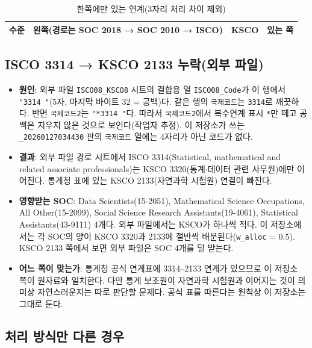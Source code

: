 \documentclass[11pt]{article}
\begin{document}
\begin{longtable}{L{1.8cm}L{5.8cm}L{4.8cm}L{3.0cm}}
\caption{한쪽에만 있는 연계(3자리 처리 차이 제외)}\label{tab:diff}\\
\toprule
수준 & 왼쪽(경로는 SOC 2018 → SOC 2010 → ISCO) & KSCO & 있는 쪽 \\
\midrule

\bottomrule
\end{longtable}

\subsection{ISCO 3314 → KSCO 2133 누락(외부 파일)}

\begin{itemize}[leftmargin=*]
  \item \textbf{원인}: 외부 파일 \texttt{ISCO08\_KSCO8} 시트의 결합용 열 \texttt{ISCO08\_Code}가 이 행에서 \texttt{"3314 "}(5자, 마지막 바이트 32 = 공백)다. 같은 행의 \texttt{국제코드}는 \texttt{3314}로 깨끗하다. 반면 \texttt{국제코드2}는 \texttt{"*3314 "}다. 따라서 \texttt{국제코드2}에서 복수연계 표시 \texttt{*}만 떼고 공백은 지우지 않은 것으로 보인다(작업자 추정). 이 저장소가 쓰는 \texttt{\_20260127034430} 판의 \texttt{국제코드} 열에는 4자리가 아닌 코드가 없다.
  \item \textbf{결과}: 외부 파일 경로 시트에서 ISCO 3314(Statistical, mathematical and related associate professionals)는 KSCO 3320(통계$\cdot$데이터 관련 사무원)에만 이어진다. 통계청 표에 있는 KSCO 2133(자연과학 시험원) 연결이 빠진다.
  \item \textbf{영향받는 SOC}: Data Scientists(15-2051), Mathematical Science Occupations, All Other(15-2099), Social Science Research Assistants(19-4061), Statistical Assistants(43-9111) 4개다. 외부 파일에서는 KSCO가 하나씩 적다. 이 저장소에서는 각 SOC의 양이 KSCO 3320과 2133에 절반씩 배분된다(\texttt{w\_alloc} = 0.5). KSCO 2133 쪽에서 보면 외부 파일은 SOC 4개를 덜 받는다.
  \item \textbf{어느 쪽이 맞는가}: 통계청 공식 연계표에 3314–2133 연계가 있으므로 이 저장소 쪽이 원자료와 일치한다. 다만 통계 보조원이 자연과학 시험원과 이어지는 것이 의미상 자연스러운지는 따로 판단할 문제다. 공식 표를 따른다는 원칙상 이 저장소는 그대로 둔다.
\end{itemize}

\subsection{처리 방식만 다른 경우}
\end{document}
